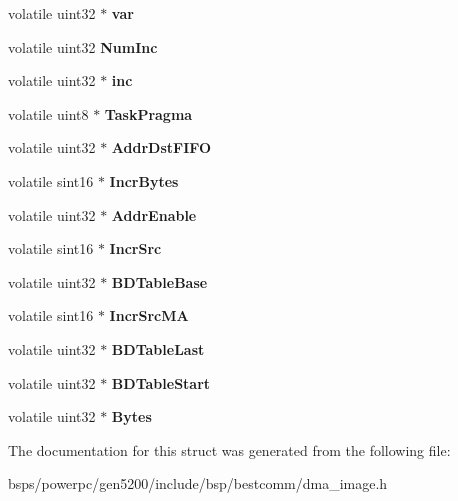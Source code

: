 \begin{DoxyCompactItemize}
\item 
\mbox{\label{structtask__info12_a15057c13e5b6708ec9bb6c09d73f0e9f}} 
volatile uint32 $\ast$ {\bfseries var}
\item 
\mbox{\label{structtask__info12_ab632443c5552295346bdd54872362b43}} 
volatile uint32 {\bfseries Num\+Inc}
\item 
\mbox{\label{structtask__info12_a7ba81eb61ff6e2a2b3df72d7e1bba09b}} 
volatile uint32 $\ast$ {\bfseries inc}
\item 
\mbox{\label{structtask__info12_a9ac8f1b527f81bbf67f2569338813b36}} 
volatile uint8 $\ast$ {\bfseries Task\+Pragma}
\item 
\mbox{\label{structtask__info12_aba39d35badeaf7625887e27f87d19fff}} 
volatile uint32 $\ast$ {\bfseries Addr\+Dst\+F\+I\+FO}
\item 
\mbox{\label{structtask__info12_a799b8974b40a584f0e2dbf5f0f9b5446}} 
volatile sint16 $\ast$ {\bfseries Incr\+Bytes}
\item 
\mbox{\label{structtask__info12_ab08a34fa835a2ca9ef24a3da6f5d162a}} 
volatile uint32 $\ast$ {\bfseries Addr\+Enable}
\item 
\mbox{\label{structtask__info12_a1c8bb64a1213a48df7a1d91a3e6b018f}} 
volatile sint16 $\ast$ {\bfseries Incr\+Src}
\item 
\mbox{\label{structtask__info12_ad638c8d8c7a9797f01f40ad2198f3952}} 
volatile uint32 $\ast$ {\bfseries B\+D\+Table\+Base}
\item 
\mbox{\label{structtask__info12_a1b6c86b144c32a64ea890923c9146cbb}} 
volatile sint16 $\ast$ {\bfseries Incr\+Src\+MA}
\item 
\mbox{\label{structtask__info12_af0d71aa1b93d28764dae1755d8783d22}} 
volatile uint32 $\ast$ {\bfseries B\+D\+Table\+Last}
\item 
\mbox{\label{structtask__info12_aad193104796a99008648b28919a57200}} 
volatile uint32 $\ast$ {\bfseries B\+D\+Table\+Start}
\item 
\mbox{\label{structtask__info12_aad62b3404239cb936937b5535c84ce8a}} 
volatile uint32 $\ast$ {\bfseries Bytes}
\end{DoxyCompactItemize}


The documentation for this struct was generated from the following file\+:\begin{DoxyCompactItemize}
\item 
bsps/powerpc/gen5200/include/bsp/bestcomm/dma\+\_\+image.\+h\end{DoxyCompactItemize}
